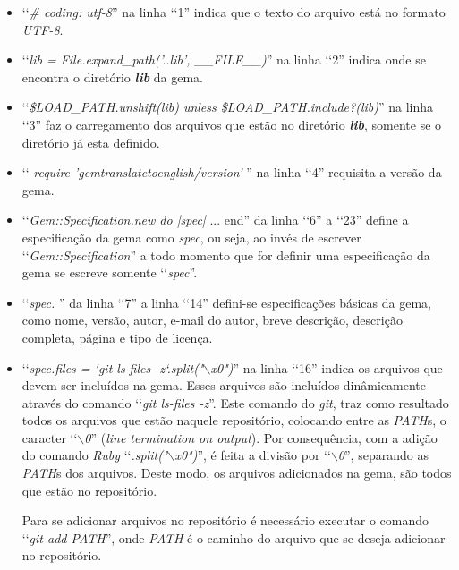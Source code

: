 \begin{itemize}

 \item ‘‘\emph{\# coding: utf-8}'' na linha ‘‘1'' indica que o texto do arquivo está no formato \emph{UTF-8}.

 \item ‘‘\emph{lib = File.expand\_path('..\/lib', \_\_FILE\_\_)}'' na linha ‘‘2'' indica onde se encontra o
 diretório \emph{\textbf{lib}} da gema.

 \item ‘‘\emph{\$LOAD\_PATH.unshift(lib) unless \$LOAD\_PATH.include?(lib)}'' na linha ‘‘3'' faz o
 carregamento dos arquivos que estão no diretório \emph{\textbf{lib}}, somente se o diretório já
 esta definido.

 \item ‘‘ \emph{require 'gemtranslatetoenglish/version'} '' na linha ‘‘4'' requisita a versão da gema.

 \item ‘‘\emph{Gem::Specification.new do |spec|} ... end'' da linha ‘‘6'' a ‘‘23'' define a especificação da
 gema como \emph{spec}, ou seja, ao invés de escrever ‘‘\emph{Gem::Specification}'' a todo momento que for
 definir uma especificação da gema se escreve somente ‘‘\emph{spec}''.

 \item ‘‘\emph{spec. }'' da linha ‘‘7'' a linha ‘‘14'' defini-se especificações básicas da gema, como nome,
 versão, autor, e-mail do autor, breve descrição, descrição completa, página e tipo de licença.

 \item ‘‘\emph{spec.files = `git ls-files -z`.split("$\backslash$x0")}'' na linha ‘‘16'' indica os arquivos
 que devem ser incluídos na gema. Esses arquivos são incluídos dinâmicamente através do comando
 ‘‘\emph{git ls-files -z}''. Este comando do \emph{git}, traz como resultado todos os arquivos que estão
 naquele repositório, colocando entre as \emph{PATH}s, o caracter ‘‘\emph{$\backslash$0}''
 (\emph{line termination on output}). Por consequência, com a adição do comando \emph{Ruby}
 ‘‘\emph{.split("$\backslash$x0")}'', é feita a divisão por ‘‘\emph{$\backslash$0}'', separando as
 \emph{PATH}s dos arquivos. Deste modo, os arquivos adicionados na gema, são todos que estão no repositório.

 Para se adicionar arquivos no repositório é necessário executar o comando ‘‘\emph{git add PATH}'',
 onde \emph{PATH} é o caminho do arquivo que se deseja adicionar no repositório.


\end{itemize}
